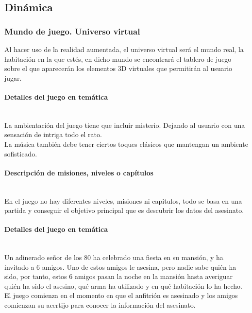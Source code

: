 \subsection{Dinámica}
\subsubsection{Mundo de juego. Universo virtual}
Al hacer uso de la realidad aumentada, el universo virtual será el mundo real, la habitación en la que estés, en dicho mundo se encontrará el tablero de juego sobre el que aparecerán los elementos 3D virtuales que permitirán al usuario jugar.

\paragraph{Detalles del juego en temática}\mbox{}\\
La ambientación del juego tiene que incluir misterio. Dejando al usuario con una sensación de intriga todo el rato.\\

La música también debe tener ciertos toques clásicos que mantengan un ambiente sofisticado.

\paragraph{Descripción de misiones, niveles o capítulos}\mbox{}\\
En el juego no hay diferentes niveles, misiones ni capitulos, todo se basa en una partida y conseguir el objetivo principal que es descubrir los datos del asesinato.

\paragraph{Detalles del juego en temática}\mbox{}\\
Un adinerado señor de los 80 ha celebrado una fiesta en su mansión, y ha invitado a 6 amigos. Uno de estos amigos le asesina, pero nadie sabe quién ha sido, por tanto, estos 6 amigos pasan la noche en la mansión hasta averiguar quién ha sido el asesino, qué arma ha utilizado y en qué habitación lo ha hecho.\\

El juego comienza en el momento en que el anfitrión es asesinado y los amigos comienzan su acertijo para conocer la información del asesinato.\\

